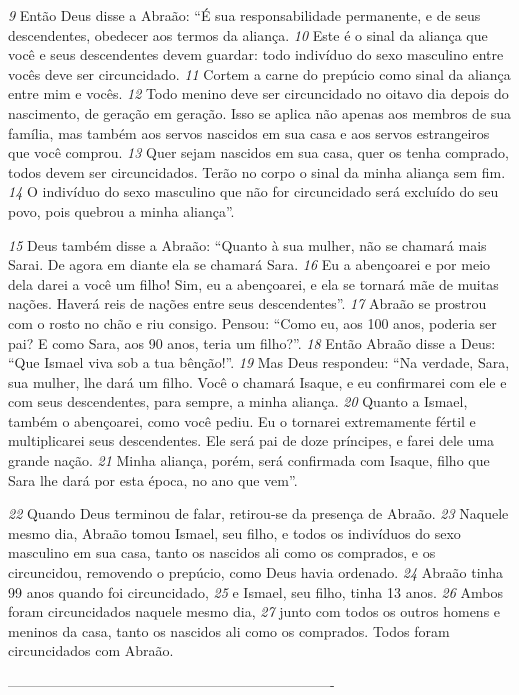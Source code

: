 \bigskip
\textit{\tiny 9}
Então Deus disse a Abraão: “É sua responsabilidade permanente, e de seus
descendentes, obedecer aos termos da aliança. 
\textit{\tiny 10}
Este é o sinal da aliança que você
e seus descendentes devem guardar: todo indivíduo do sexo masculino entre
vocês deve ser circuncidado. 
\textit{\tiny 11}
Cortem a carne do prepúcio como sinal da aliança
entre mim e vocês. 
\textit{\tiny 12}
Todo menino deve ser circuncidado no oitavo dia depois do
nascimento, de geração em geração. Isso se aplica não apenas aos membros de sua família, mas também aos servos nascidos em sua casa e aos servos
estrangeiros que você comprou. 
\textit{\tiny 13}
Quer sejam nascidos em sua casa, quer os
tenha comprado, todos devem ser circuncidados. Terão no corpo o sinal da minha
aliança sem fim. 
\textit{\tiny 14}
O indivíduo do sexo masculino que não for circuncidado será
excluído do seu povo, pois quebrou a minha aliança”.

\bigskip
\textit{\tiny 15}
Deus também disse a Abraão: “Quanto à sua mulher, não se chamará mais Sarai.
De agora em diante ela se chamará Sara. 
\textit{\tiny 16}
Eu a abençoarei e por meio dela darei
a você um filho! Sim, eu a abençoarei, e ela se tornará mãe de muitas nações.
Haverá reis de nações entre seus descendentes”.
\textit{\tiny 17}
Abraão se prostrou com o rosto no chão e riu consigo. Pensou: “Como eu, aos
100 anos, poderia ser pai? E como Sara, aos 90 anos, teria um filho?”. 
\textit{\tiny 18}
Então
Abraão disse a Deus: “Que Ismael viva sob a tua bênção!”.
\textit{\tiny 19}
Mas Deus respondeu: “Na verdade, Sara, sua mulher, lhe dará um filho. Você
o chamará Isaque, e eu confirmarei com ele e com seus descendentes, para
sempre, a minha aliança. 
\textit{\tiny 20}
Quanto a Ismael, também o abençoarei, como você
pediu. Eu o tornarei extremamente fértil e multiplicarei seus descendentes. Ele
será pai de doze príncipes, e farei dele uma grande nação. 
\textit{\tiny 21}
Minha aliança,
porém, será confirmada com Isaque, filho que Sara lhe dará por esta época, no
ano que vem”.

\bigskip 
\textit{\tiny 22}
Quando Deus terminou de falar, retirou-se da presença de
Abraão.
\textit{\tiny 23}
Naquele mesmo dia, Abraão tomou Ismael, seu filho, e todos os indivíduos do
sexo masculino em sua casa, tanto os nascidos ali como os comprados, e os
circuncidou, removendo o prepúcio, como Deus havia ordenado. 
\textit{\tiny 24}
Abraão tinha
99 anos quando foi circuncidado, 
\textit{\tiny 25}
e Ismael, seu filho, tinha 13 anos. 
\textit{\tiny 26}
Ambos
foram circuncidados naquele mesmo dia, 
\textit{\tiny 27}
junto com todos os outros homens e
meninos da casa, tanto os nascidos ali como os comprados. Todos foram
circuncidados com Abraão.

----------------------------------------------------------------------
